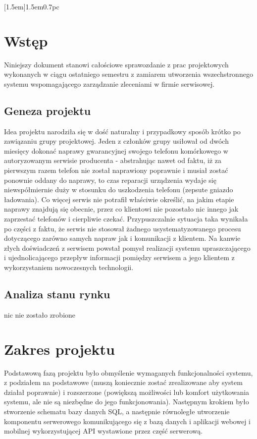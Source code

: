 \documentclass[a4paper,11pt]{article}
\begin{document}
\newpage
\maketitle
\newpage

[1.5em]{\addvspace{1pc}\bfseries}{1.5em}{0.7pc}

\renewcommand\lstlistingname{Listing}
\renewcommand\lstlistlistingname{Spis listingów}

\tableofcontents

\newpage

\makeatother

\section{Wstęp}
Niniejszy dokument stanowi całościowe sprawozdanie z prac projektowych wykonanych w ciągu ostatniego semestru z zamiarem utworzenia wszechstronnego systemu wspomagającego zarządzanie zleceniami w firmie serwisowej.
\subsection{Geneza projektu}
Idea projektu narodziła się w dość naturalny i przypadkowy sposób krótko po zawiązaniu grupy projektowej. Jeden z członków grupy usiłował od dwóch miesięcy dokonać naprawy gwarancyjnej swojego telefonu komórkowego w autoryzowanym serwisie producenta - abstrahując nawet od faktu, iż za pierwszym razem telefon nie został naprawiony poprawnie i musiał zostać ponownie oddany do naprawy, to czas reparacji urządzenia wydaje się niewspółmiernie duży w stosunku do uszkodzenia telefonu (zepsute gniazdo ładowania). Co więcej serwis nie potrafił właściwie określić, na jakim etapie naprawy znajdują się obecnie, przez co klientowi nie pozostało nic innego jak zaprzestać telefonów i cierpliwie czekać. Przypuszczalnie sytuacja taka wynikała po części z faktu, że serwis nie stosował żadnego usystematyzowanego procesu dotyczącego zarówno samych napraw jak i komunikacji z klientem. Na kanwie złych doświadczeń z serwisem powstał pomysł realizacji systemu upraszczającego i ujednolicającego przepływ informacji pomiędzy serwisem a jego klientem z wykorzystaniem nowoczesnych technologii.
\subsection{Analiza stanu rynku}
nic nie zostało zrobione
\section{Zakres projektu}
Podstawową fazą projektu było obmyślenie wymaganych funkcjonalności systemu, z podziałem na podstawowe (muszą koniecznie zostać zrealizowane aby system działał poprawnie) i rozszerzone (powiększą możliwości lub komfort użytkowania systemu, ale nie są niezbędne do jego funkcjonowania). Następnym krokiem było stworzenie schematu bazy danych SQL, a następnie równoległe utworzenie komponentu serwerowego komunikującego się z bazą danych i aplikacji webowej i mobilnej wykorzystującej API wystawione przez część serwerową.
\end{document}
